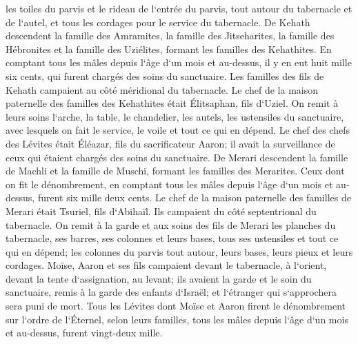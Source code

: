 \verse les toiles du parvis et le rideau de l`entrée du parvis, tout autour du tabernacle et de l`autel, et tous les cordages pour le service du tabernacle. 
\verse De Kehath descendent la famille des Amramites, la famille des Jitseharites, la famille des Hébronites et la famille des Uziélites, formant les familles des Kehathites. 
\verse En comptant tous les mâles depuis l`âge d`un mois et au-dessus, il y en eut huit mille six cents, qui furent chargés des soins du sanctuaire. 
\verse Les familles des fils de Kehath campaient au côté méridional du tabernacle. 
\verse Le chef de la maison paternelle des familles des Kehathites était Élitsaphan, fils d`Uziel. 
\verse On remit à leurs soins l`arche, la table, le chandelier, les autels, les ustensiles du sanctuaire, avec lesquels on fait le service, le voile et tout ce qui en dépend. 
\verse Le chef des chefs des Lévites était Éléazar, fils du sacrificateur Aaron; il avait la surveillance de ceux qui étaient chargés des soins du sanctuaire. 
\verse De Merari descendent la famille de Machli et la famille de Muschi, formant les familles des Merarites. 
\verse Ceux dont on fit le dénombrement, en comptant tous les mâles depuis l`âge d`un mois et au-dessus, furent six mille deux cents. 
\verse Le chef de la maison paternelle des familles de Merari était Tsuriel, fils d`Abihaïl. Ils campaient du côté septentrional du tabernacle. 
\verse On remit à la garde et aux soins des fils de Merari les planches du tabernacle, ses barres, ses colonnes et leurs bases, tous ses ustensiles et tout ce qui en dépend; 
\verse les colonnes du parvis tout autour, leurs bases, leurs pieux et leurs cordages. 
\verse Moïse, Aaron et ses fils campaient devant le tabernacle, à l`orient, devant la tente d`assignation, au levant; ils avaient la garde et le soin du sanctuaire, remis à la garde des enfants d`Israël; et l`étranger qui s`approchera sera puni de mort. 
\verse Tous les Lévites dont Moïse et Aaron firent le dénombrement sur l`ordre de l`Éternel, selon leurs familles, tous les mâles depuis l`âge d`un mois et au-dessus, furent vingt-deux mille. 

